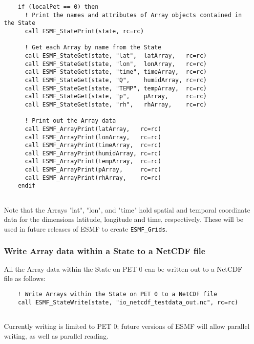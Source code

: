  \begin{verbatim}
    if (localPet == 0) then
      ! Print the names and attributes of Array objects contained in the State
      call ESMF_StatePrint(state, rc=rc)

      ! Get each Array by name from the State
      call ESMF_StateGet(state, "lat",  latArray,   rc=rc)
      call ESMF_StateGet(state, "lon",  lonArray,   rc=rc)
      call ESMF_StateGet(state, "time", timeArray,  rc=rc)
      call ESMF_StateGet(state, "Q",    humidArray, rc=rc)
      call ESMF_StateGet(state, "TEMP", tempArray,  rc=rc)
      call ESMF_StateGet(state, "p",    pArray,     rc=rc)
      call ESMF_StateGet(state, "rh",   rhArray,    rc=rc)

      ! Print out the Array data
      call ESMF_ArrayPrint(latArray,   rc=rc)
      call ESMF_ArrayPrint(lonArray,   rc=rc)
      call ESMF_ArrayPrint(timeArray,  rc=rc)
      call ESMF_ArrayPrint(humidArray, rc=rc)
      call ESMF_ArrayPrint(tempArray,  rc=rc)
      call ESMF_ArrayPrint(pArray,     rc=rc)
      call ESMF_ArrayPrint(rhArray,    rc=rc)
    endif
 
\end{verbatim}
 

    Note that the Arrays "lat", "lon", and "time" hold spatial and temporal
    coordinate data for the dimensions latitude, longitude and time,
    respectively.  These will be used in future releases of ESMF to create
    {\tt ESMF\_Grids}. 

  \subsubsection{Write Array data within a State to a NetCDF file}
  
    All the Array data within the State on PET 0 can be written out to a NetCDF
    file as follows: 

 \begin{verbatim}
    ! Write Arrays within the State on PET 0 to a NetCDF file
    call ESMF_StateWrite(state, "io_netcdf_testdata_out.nc", rc=rc)
 
\end{verbatim}
 

    Currently writing is limited to PET 0; future versions of ESMF will allow
    parallel writing, as well as parallel reading.
\setlength{\parskip}{\oldparskip}
\setlength{\parindent}{\oldparindent}
\setlength{\baselineskip}{\oldbaselineskip}
